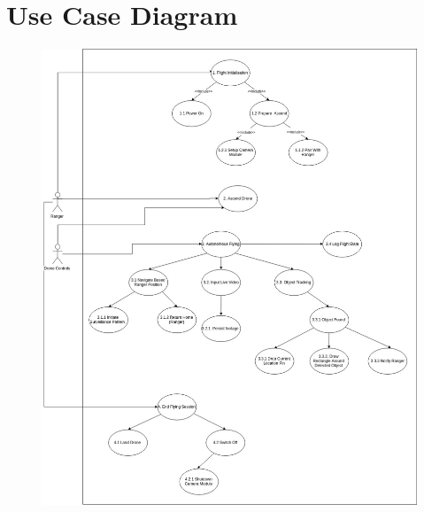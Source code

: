 \section{Use Case Diagram}

	\begin{figure}[h!]
		\centering
		\includegraphics[scale=0.35]{./assets/images/uc-diagram-1.jpg}
		\label{fig: use-case-diagram}
		\caption{}
	\end{figure}



